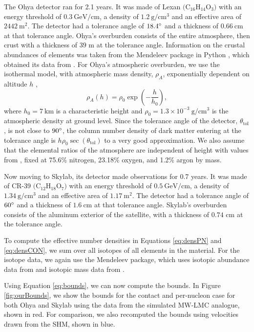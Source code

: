 \documentclass[12pt]{article}
\begin{document}
The Ohya detector ran for 2.1 years. It was made of Lexan $\mathrm{(C_{16}H_{14}O_3})$ with an energy threshold of $0.3 \: \text{GeV}/\text{cm}$, a density of $1.2  \:\text{g}/\text{cm}^{3}$ and an effective area of $2442 \: \text{m}^2$. The detector had a tolerance angle of $18.4\degree$ and a thickness of $0.66\: \text{cm}$ at that tolerance angle.
Ohya's overburden consists of the entire atmosphere, then crust with a thickness of $39$ m at the tolerance angle. Information on the crustal abundances of elements was taken from the Mendeleev package in Python \cite{mendeleev2014}, which obtained its data from \cite{haynes2014crc}.
For Ohya's atmospheric overburden, we use the isothermal model, with atmospheric mass density, $\rho_A$, exponentially dependent on altitude $h$ \cite{Cappiello:2023},
\begin{equation}\label{eq:isotherm}
    \rho_A(h) = \rho_0\exp\left(-\frac{h}{h_0}\right),
\end{equation}
where $h_0 = 7\:\text{km}$ is a characteristic height and $\rho_0 = 1.3\times 10^{-3}\: \text{g}/\text{cm}^3$ is the atmospheric density at ground level. Since the tolerance angle of the detector, $\theta_{\mathrm{tol}}$, is not close to $90\degree$, the column number density of dark matter entering at the tolerance angle is $h\rho_0\sec(\theta_{\mathrm{tol}})$ to a very good approximation. We also assume that the elemental ratios of the atmosphere are independent of height with values from \cite{Bramante2023Atm}, fixed at 75.6\% nitrogen, 23.18\% oxygen, and 1.2\% argon by mass.

Now moving to Skylab, its detector made observations for 0.7 years. It was made of CR-39 $\mathrm{(C_{12}H_{18}O_7})$ with an energy threshold of $0.5 \: \text{GeV}/\text{cm}$, a density of $1.34  \:\text{g}/\text{cm}^{3}$ and an effective area of $1.17 \:\text{m}^2$. The detector had a tolerance angle of $60\degree$ and a thickness of $1.6\: \text{cm}$ at that tolerance angle.
Skylab's overburden consists of the aluminum exterior of the satellite, with a thickness of $0.74$ cm at the tolerance angle.


To compute the effective number densities in Equations \ref{eq:densPN} and \ref{eq:densCON}, we sum over all isotopes of all elements in the material. For the isotope data, we again use the Mendeleev package, which uses isotopic abundance data from \cite{Kondev_2021} and isotopic mass data from \cite{isotopeMasses}.


Using Equation \ref{eq:bounds}, we can now compute the bounds. In Figure \ref{fig:ourBounds}, we show the bounds for the contact and per-nucleon case for both Ohya and Skylab using the data from the simulated MW-LMC analogue, shown in red. For comparison, we also recomputed the bounds using velocities drawn from the SHM, shown in blue. 
\end{document}
